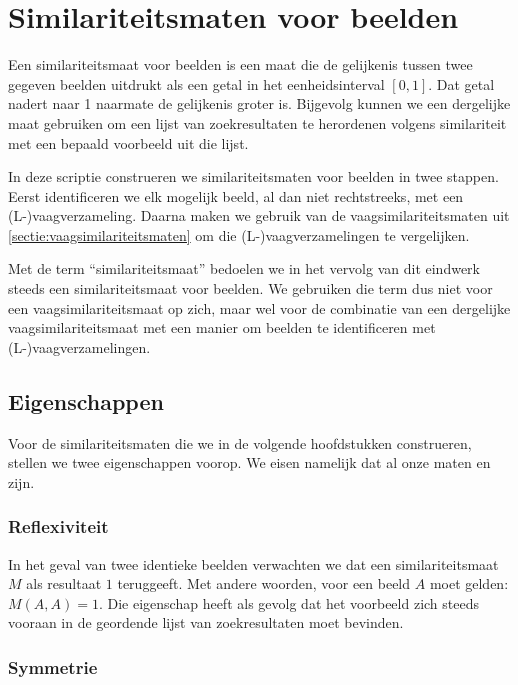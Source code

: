 \chapter{Similariteitsmaten voor beelden}

Een similariteitsmaat voor beelden is een maat die de gelijkenis tussen twee gegeven
beelden uitdrukt als een getal in het eenheidsinterval $[0,1]$. Dat getal nadert naar 1
naarmate de gelijkenis groter is. Bijgevolg kunnen we een dergelijke maat gebruiken om
een lijst van zoekresultaten te herordenen volgens similariteit met een bepaald 
voorbeeld uit die lijst. 

In deze scriptie construeren we similariteitsmaten voor beelden in twee stappen. 
Eerst identificeren we elk mogelijk beeld, al dan niet rechtstreeks, met 
een (L-)vaagverzameling. Daarna maken we gebruik van
de vaagsimilariteitsmaten uit \ref{sectie:vaagsimilariteitsmaten} om die 
(L-)vaagverzamelingen te vergelijken. 

Met de term ``similariteitsmaat'' bedoelen we in het vervolg van dit eindwerk steeds
een similariteitsmaat voor beelden. We gebruiken die term dus niet voor een vaagsimilariteitsmaat
op zich, maar wel voor de combinatie van een dergelijke vaagsimilariteitsmaat met een manier om beelden te 
identificeren met (L-)vaagverzamelingen.

\section{Eigenschappen}

Voor de similariteitsmaten die we in de volgende hoofdstukken construeren,
stellen we twee eigenschappen voorop. We eisen namelijk dat al onze 
maten  en  zijn.

\subsection{Reflexiviteit}

In het geval van twee identieke beelden verwachten we dat een similariteitsmaat $M$ als resultaat $1$
teruggeeft. Met andere woorden, voor een beeld $A$ moet gelden: $M(A,A)=1$.
Die eigenschap heeft als gevolg dat het voorbeeld zich steeds vooraan in
de geordende lijst van zoekresultaten moet bevinden.

\subsection{Symmetrie}

